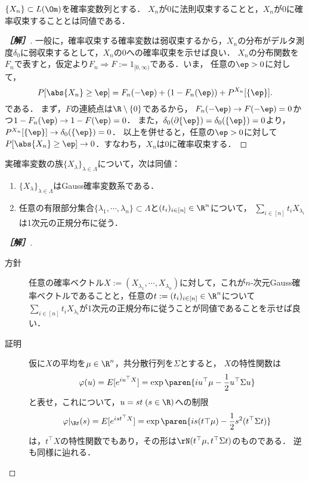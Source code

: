 \documentclass[uplatex,dvipdfmx]{jsarticle}
\begin{document}
\begin{problem*}[24]
    $\{X_n\}\subset L(\Om)$を確率変数列とする．
    $X_n$が$0$に法則収束することと，$X_n$が$0$に確率収束することとは同値である．
\end{problem*}
\begin{proof}[\bf［解］]
    一般に，確率収束する確率変数は弱収束するから，$X_n$の分布がデルタ測度$\delta_0$に弱収束するとして，$X_n$の$0$への確率収束を示せば良い．
    $X_n$の分布関数を$F_n$で表すと，仮定より$F_n\Rightarrow F:=1_{[0,\infty)}$である．いま，
    任意の$\ep>0$に対して，
    \[P[\abs{X_n}\ge\ep]=F_n(-\ep)+(1-F_n(\ep))+P^{X_n}[\{\ep\}].\]
    である．
    まず，$F$の連続点は$\R\setminus\{0\}$であるから，
    $F_n(-\ep)\to F(-\ep)=0$かつ$1-F_n(\ep)\to 1-F(\ep)=0$．
    また，$\delta_0(\partial\{\ep\})=\delta_0(\{\ep\})=0$より，$P^{X_n}[\{\ep\}]\to \delta_0(\{\ep\})=0$．
    以上を併せると，任意の$\ep>0$に対して$P[\abs{X_n}\ge\ep]\to0$．すなわち，$X_n$は$0$に確率収束する．
\end{proof}

\begin{problem*}[31]
    実確率変数の族$\{X_\lambda\}_{\lambda\in\Lambda}$について，次は同値：
    \begin{enumerate}
        \item $\{X_\lambda\}_{\lambda\in\Lambda}$はGauss確率変数系である．
        \item 任意の有限部分集合$\{\lambda_1,\cdots,\lambda_n\}\subset\Lambda$と$(t_i)_{i\in[n]}\in\R^n$について，
        $\sum_{i\in[n]}t_iX_{\lambda_i}$は1次元の正規分布に従う．
    \end{enumerate}
\end{problem*}
\begin{proof}[\bf［解］]\mbox{}
    \begin{description}
        \item[方針] 任意の確率ベクトル$X:=(X_{\lambda_1},\cdots,X_{\lambda_n})$に対して，これが$n$-次元Gauss確率ベクトルであることと，任意の$t:=(t_i)_{i\in[n]}\in\R^n$について$\sum_{i\in[n]}t_iX_{\lambda_i}$が1次元の正規分布に従うことが同値であることを示せば良い．
        \item[証明] 仮に$X$の平均を$\mu\in\R^n$，共分散行列を$\Sigma$とすると，
        $X$の特性関数は
        \[\varphi(u)=E[e^{iu^\top X}]=\exp\paren{iu^\top\mu-\frac{1}{2}u^\top\Sigma u}\]
        と表せ，これについて，$u=st\;(s\in\R)$への制限
        \[\varphi|_{\R t}(s)=E[e^{ist^\top X}]=\exp\paren{is(t\top\mu)-\frac{1}{2}s^2(t^\top\Sigma t)}\]
        は，$t^\top X$の特性関数でもあり，その形は$\rN(t^\top\mu,t^\top\Sigma t)$のものである．
        逆も同様に辿れる．
    \end{description}
\end{proof}
\end{document}

